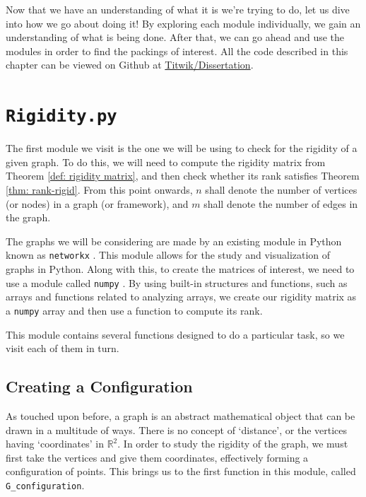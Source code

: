 \begin{flushleft}
Now that we have an understanding of what it is we're trying to do, let us dive into how we go about doing it! By exploring each module individually, we gain an understanding of what is being done. After that, we can go ahead and use the modules in order to find the packings of interest. All the code described in this chapter can be viewed on Github at \href{https://github.com/Titwik/Dissertation}{Titwik/Dissertation}.
\end{flushleft}

\section{\texttt{Rigidity.py}}

\begin{flushleft}
The first module we visit is the one we will be using to check for the rigidity of a given graph. To do this, we will need to compute the rigidity matrix from Theorem \ref{def: rigidity matrix}, and then check whether its rank satisfies Theorem \ref{thm: rank-rigid}. From this point onwards, $n$ shall denote the number of vertices (or nodes) in a graph (or framework), and $m$ shall denote the number of edges in the graph. 
\end{flushleft}

\begin{flushleft}
The graphs we will be considering are made by an existing module in Python known as \texttt{networkx} \cite{networkx}. This module allows for the study and visualization of graphs in Python. Along with this, to create the matrices of interest, we need to use a module called \texttt{numpy} \cite{numpy}. By using built-in structures and functions, such as arrays and functions related to analyzing arrays, we create our rigidity matrix as a \texttt{numpy} array and then use a function to compute its rank.
\end{flushleft}

\begin{flushleft}
This module contains several functions designed to do a particular task, so we visit each of them in turn.
\end{flushleft}

\subsection{Creating a Configuration}

\begin{flushleft}
As touched upon before, a graph is an abstract mathematical object that can be drawn in a multitude of ways. There is no concept of `distance', or the vertices having `coordinates' in $\mathbb{R}^2$. In order to study the rigidity of the graph, we must first take the vertices and give them coordinates, effectively forming a configuration of points. This brings us to the first function in this module, called \texttt{G\_configuration}.
\end{flushleft}


